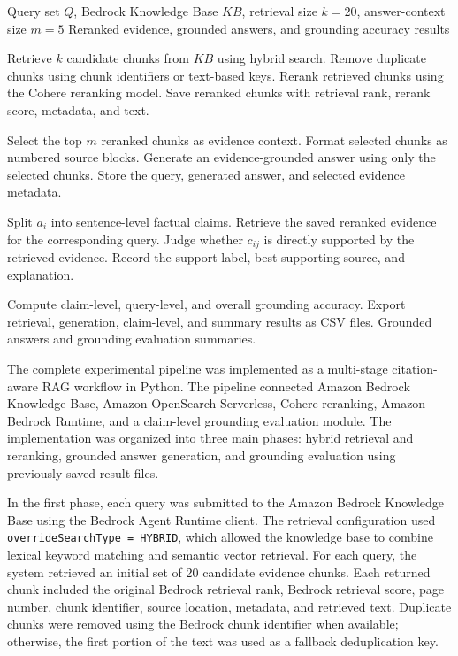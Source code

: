 \begin{algorithm}[!t]
\caption{Hybrid Retrieve-Rerank-Ground RAG Pipeline}
\label{alg:rag_pipeline}
\footnotesize
\begin{algorithmic}[1]
\REQUIRE Query set $Q$, Bedrock Knowledge Base $KB$, retrieval size $k=20$, answer-context size $m=5$
\ENSURE Reranked evidence, grounded answers, and grounding accuracy results

    \STATE Retrieve $k$ candidate chunks from $KB$ using hybrid search.
    \STATE Remove duplicate chunks using chunk identifiers or text-based keys.
    \STATE Rerank retrieved chunks using the Cohere reranking model.
    \STATE Save reranked chunks with retrieval rank, rerank score, metadata, and text.
\ENDFOR

    \STATE Select the top $m$ reranked chunks as evidence context.
    \STATE Format selected chunks as numbered source blocks.
    \STATE Generate an evidence-grounded answer using only the selected chunks.
    \STATE Store the query, generated answer, and selected evidence metadata.
\ENDFOR

    \STATE Split $a_i$ into sentence-level factual claims.
    \STATE Retrieve the saved reranked evidence for the corresponding query.
        \STATE Judge whether $c_{ij}$ is directly supported by the retrieved evidence.
        \STATE Record the support label, best supporting source, and explanation.
    \ENDFOR
\ENDFOR

\STATE Compute claim-level, query-level, and overall grounding accuracy.
\STATE Export retrieval, generation, claim-level, and summary results as CSV files.
\RETURN Grounded answers and grounding evaluation summaries.
\end{algorithmic}
\end{algorithm}

The complete experimental pipeline was implemented as a multi-stage citation-aware RAG workflow in Python. The pipeline connected Amazon Bedrock Knowledge Base, Amazon OpenSearch Serverless, Cohere reranking, Amazon Bedrock Runtime, and a claim-level grounding evaluation module. The implementation was organized into three main phases: hybrid retrieval and reranking, grounded answer generation, and grounding evaluation using previously saved result files.

In the first phase, each query was submitted to the Amazon Bedrock Knowledge Base using the Bedrock Agent Runtime client. The retrieval configuration used \texttt{overrideSearchType = HYBRID}, which allowed the knowledge base to combine lexical keyword matching and semantic vector retrieval. For each query, the system retrieved an initial set of 20 candidate evidence chunks. Each returned chunk included the original Bedrock retrieval rank, Bedrock retrieval score, page number, chunk identifier, source location, metadata, and retrieved text. Duplicate chunks were removed using the Bedrock chunk identifier when available; otherwise, the first portion of the text was used as a fallback deduplication key.

